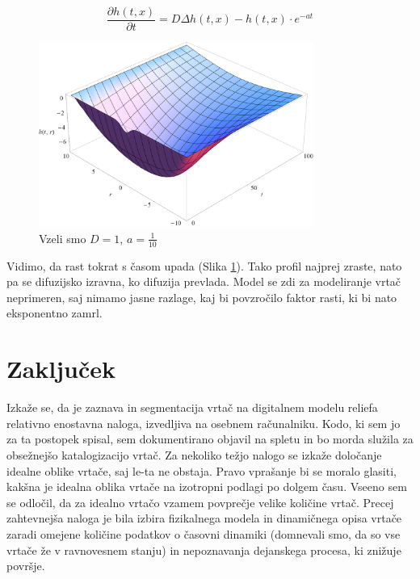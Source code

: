 \documentclass[a4paper, twoside, 12pt]{book}
\begin{document}
            \begin{equation}
              \frac{ \partial h(t,x) }{ \partial t} = D \Delta h(t,x) - h(t,x) \cdot e^{-a t}
              \label{difuzija-gompertzova-rast}
            \end{equation}
            \begin{figure}[h]
              \begin{center}
                \includegraphics[width=9cm]{slike/difuzija-gompertzova-rast2}
              \end{center}
              \caption{Vzeli smo $D=1$, $a=\frac{1}{10}$}
              \label{fig:difuzija-gompertzova-rast}
            \end{figure}

            Vidimo, da rast tokrat s časom upada (Slika \ref{fig:difuzija-gompertzova-rast}). Tako profil najprej zraste, nato pa se difuzijsko izravna, ko difuzija prevlada.
            Model se zdi za modeliranje vrtač neprimeren, saj nimamo jasne razlage, kaj bi povzročilo faktor rasti, ki bi nato eksponentno zamrl.


            \chapter{Zaključek}

            Izkaže se, da je zaznava in segmentacija vrtač na digitalnem modelu reliefa relativno enostavna naloga, izvedljiva na osebnem računalniku. Kodo, ki sem jo za ta postopek spisal, sem dokumentirano objavil na spletu in bo morda služila za obsežnejšo katalogizacijo vrtač.
Za nekoliko težjo nalogo se izkaže določanje idealne oblike vrtače, saj le-ta ne obstaja. Pravo vprašanje bi se moralo glasiti, kakšna je idealna oblika vrtače na izotropni podlagi po dolgem času. Vseeno sem se odločil, da za idealno vrtačo vzamem povprečje velike količine vrtač.
Precej zahtevnejša naloga je bila izbira fizikalnega modela in dinamičnega opisa vrtače zaradi omejene količine podatkov o časovni dinamiki (domnevali smo, da so vse vrtače že v ravnovesnem stanju) in nepoznavanja dejanskega procesa, ki znižuje površje.
\end{document}
